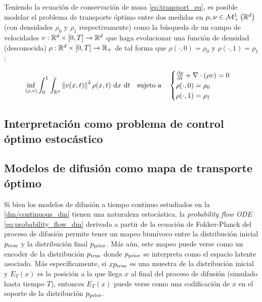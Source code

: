 Teniendo la ecuación de conservación de masa \eqref{eq:transport_eq}, es posible modelar el problema de transporte óptimo entre dos medidas en $\mu,\nu\in\mathcal{M}_+^1\left(\mathbb{R}^d\right)$ (con densidades $\rho_0$ y $\rho_1$ respectivamente) como la búsqueda de un campo de velocidades $v:\mathbb{R}^d\times[0,T]\to\mathbb{R}^d$ que haga evolucionar una función de densidad (desconocida) $\rho:\mathbb{R}^d\times[0,T]\to\mathbb{R}_+$ de tal forma que $\rho(\cdot,0)=\rho_0$ y $\rho(\cdot,1)=\rho_1$:

\begin{equation}
	\inf_{(\rho,v)} \int_0^1 \int_{\mathbb{R}^d} \left\lVert v(x,t) \right\rVert^2 \rho(x,t) \,\operatorname{d}\! x\,\operatorname{d}\! t
	\quad \text{sujeto a} \quad
	\begin{cases}
		\frac{\partial \rho}{\partial t} + \nabla\cdot(\rho v) = 0\\
		\rho(\cdot,0) = \rho_0\\
		\rho(\cdot,1) = \rho_1
	\end{cases}
\end{equation}


\subsection{Interpretación como problema de control óptimo estocástico}
\label{ot/dynamic/optimal_control}


\subsection{Modelos de difusión como mapa de transporte óptimo}
\label{ot/dynamic/dm}

Si bien los modelos de difusión a tiempo continuo estudiados en la \autoref{dm/continuous_dm} tienen una naturaleza estocástica, la \textit{probability flow ODE} \eqref{eq:probability_flow_dm} derivada a partir de la ecuación de Fokker-Planck del proceso de difusión permite tener un mapeo biunívoco entre la distribución inicial $p_{\operatorname{true}}$ y la distribución final $p_{\operatorname{prior}}$. Más aún, este mapeo puede verse como un encoder de la distribución $p_{\operatorname{true}}$ donde $p_{\operatorname{prior}}$ se interpreta como el espacio latente asociado. Más específicamente, si $xp_{\operatorname{true}}$ es una muestra de la distribución inicial y $E_T(x)$ es la posición a la que llega $x$ al final del proceso de difusión (simulado hasta tiempo $T$), entonces $E_T(x)$ puede verse como una codificación de $x$ en el soporte de la distribución $p_{\operatorname{prior}}$.

